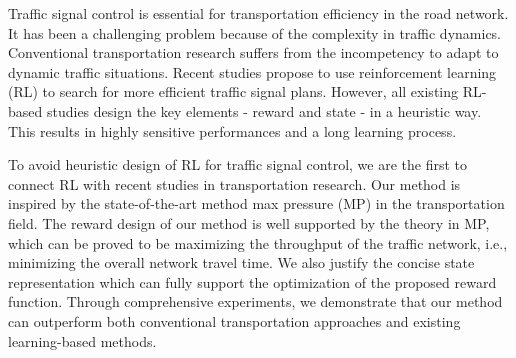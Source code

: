 
\begin{abstract}


\end{abstract}

\begin{englishabstract}
Traffic signal control is essential for transportation efficiency in the road network. It has been a challenging problem because of the complexity in traffic dynamics. Conventional transportation research suffers from the incompetency to adapt to dynamic traffic situations. Recent studies propose to use reinforcement learning (RL) to search for more efficient traffic signal plans. However, all existing RL-based studies design the key elements - reward and state - in a heuristic way. This results in highly sensitive performances and a long learning process.

To avoid heuristic design of RL for traffic signal control, we are the first to connect RL with recent studies in transportation research. Our method is inspired by the state-of-the-art method max pressure (MP) in the transportation field. The reward design of our method is well supported by the theory in MP, which can be proved to be maximizing the throughput of the traffic network, i.e., minimizing the overall network travel time. We also justify the concise state representation which can fully support the optimization of the proposed reward function. Through comprehensive experiments, we demonstrate that our method can outperform both conventional transportation approaches and existing learning-based methods.


\end{englishabstract}

